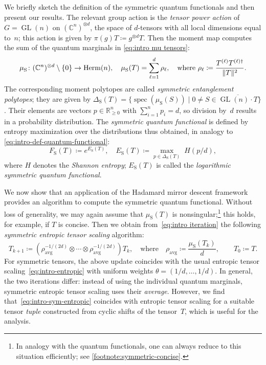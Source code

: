 \documentclass[11pt,letterpaper]{article}
\numberwithin{equation}{section}
\newcommand{\ot}{\otimes}
\newcommand{\RR}{\mathbb{R}}
\newcommand{\CC}{\mathbb{C}}
\newcommand{\qfunc}{F}
\newcommand{\logqfunc}{E}
\DeclareMathOperator{\spec}{spec}
\DeclareMathOperator{\GL}{GL}
\DeclareMathOperator{\Sym}{S}
\DeclareMathOperator{\Herm}{Herm}
\DeclarePairedDelimiter\norm{\lVert}{\rVert}
\begin{document}
We briefly sketch the definition of the symmetric quantum functionals and then present our results.
The relevant group action is the \emph{tensor power action} of $G = \GL(n)$ on $(\CC^n)^{\ot d}$, the space of $d$-tensors with all local dimensions equal to~$n$;
this action is given by $\pi(g) T \coloneqq g^{\ot d} T$.
Then the moment map computes the sum of the quantum marginals in \cref{eq:intro mu tensors}:
\[
    \mu_{\Sym} \colon (\CC^n)^{\ot d} \setminus \{0\} \rightarrow \Herm(n), \quad
    \mu_{\Sym}(T) = \sum_{\ell=1}^d \rho_\ell, \quad\text{where } \rho_\ell \coloneqq \frac{T^{(\ell)}T^{(\ell)\dag}}{\norm{T}^2}.
\]
The corresponding moment polytopes are called \emph{symmetric entanglement polytopes}; they are given by $\Delta_{\Sym}(T) = \{ \spec(\mu_{\Sym}(S)) \mid 0 \neq S \in \overline{\GL(n) \cdot T} \}$.
Their elements are vectors $p\in\RR^{n}_{\geq 0}$ with $\sum_{i=1}^n p_i=d$, so division by~$d$ results in a probability distribution.
The \emph{symmetric quantum functional} is defined by entropy maximization over the distributions thus obtained, in analogy to \cref{eq:intro-def-quantum-functional}:
\begin{equation*}
    \qfunc_{\Sym}(T) \coloneqq e^{\logqfunc_{\Sym}(T)}, \quad \logqfunc_{\Sym}(T) \coloneqq \max_{p\in\Delta_{\Sym}(T)}\; H(p/d),
\end{equation*}
where $H$ denotes the \emph{Shannon entropy};
$\logqfunc_{\Sym}(T)$ is called the \emph{logarithmic symmetric quantum functional}.

We now show that an application of the Hadamard mirror descent framework provides an algorithm to compute the symmetric quantum functional.
Without loss of generality, we may again assume that $\mu_{\Sym}(T)$ is nonsingular;\footnote{In analogy with the quantum functionals, one can always reduce to this situation efficiently; see \cref{footnote:symmetric-concise}.}
this holds, for example, if $T$ is concise.
Then we obtain from~\eqref{eq:intro iteration} the following \emph{symmetric entropic tensor scaling} algorithm:
\begin{equation}\label{eq:intro-sym-entropic}
    T_{k + 1} \coloneqq \left(\rho_\text{avg}^{-1/(2d)}\otimes\cdots\otimes\rho_\text{avg}^{-1/(2d)}\right)T_k, \quad \text{where}\quad\rho_\text{avg} \coloneqq \frac{\mu_{\Sym}(T_k)}d,\qquad T_0 \coloneqq T.
\end{equation}
For symmetric tensors, the above update coincides with the usual entropic tensor scaling~\eqref{eq:intro-entropic} with uniform weights $\theta=(1/d,\dots,1/d)$.
In general, the two iterations differ: instead of using the individual quantum marginals, symmetric entropic tensor scaling uses their \emph{average}.
However, we find that~\eqref{eq:intro-sym-entropic} coincides with entropic tensor scaling for a suitable tensor \emph{tuple} constructed from cyclic shifts of the tensor~$T$, which is useful for the analysis.
\end{document}
